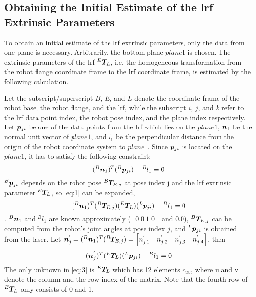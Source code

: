 \subsection{Obtaining the Initial Estimate of the \ac{lrf} Extrinsic Parameters}
\label{sec:first_step}
To obtain an initial estimate of the \ac{lrf} extrinsic parameters, only the data from one plane is necessary. Arbitrarily, the bottom plane $plane 1$ is chosen. The extrinsic parameters of the \ac{lrf} ${^E}\vb*{T}_L$, i.e. the homogeneous transformation from the robot flange coordinate frame to the \ac{lrf} coordinate frame, is estimated by the following calculation. 

Let the subscript/superscript $B$, $E$, and $L$ denote the coordinate frame of the robot base, the robot flange, and the \ac{lrf}, while the subscript $i$, $j$, and $k$ refer to the \ac{lrf} data point index, the robot pose index, and the plane index respectively. Let $\vb*{p}_{ji}$ be one of the data points from the \ac{lrf} which lies on the $plane 1$, $\vb*{n}_1$ be the normal unit vector of $plane 1$, and $l_1$ be the perpendicular distance from the origin of the robot coordinate system to $plane 1$.  Since $\vb*{p}_{ji}$ is located on the $plane 1$, it has to satisfy the following constraint:
  \begin{equation}
  \label{eq:1}
  ({^B}\vb*{n}_1) ^T ({^B}\vb*{p}_{ji}) - {^B}l_1 = 0
   \end{equation}
${^B}\vb*{p}_{ji}$ depends on the robot pose ${^B}\vb*{T}_{E,j}$ at pose index j and the \ac{lrf} extrinsic parameter ${^E}\vb*{T}_L$, so \eqref{eq:1}  can be expanded,
  \begin{equation}
  ({^B}\vb*{n}_1) ^T ({^B}\vb*{T}_{E,j}) ({^E}\vb*{T}_L) ({^L}\vb*{p}_{ji}) - {^B}l_1 = 0
  \end{equation}.
${^B}\vb*{n}_1$ and $^{B}l_1$ are known approximately ($[0 \; 0\; 1\;0]$ and $0.0$), ${^B}\vb*{T}_{E,j}$ can be computed from the robot's joint angles at pose index $j$, and ${^L}\vb*{p}_{ji}$ is obtained from the laser. Let $\vb*{n}^{'}_j = ({^B}\vb*{n}_1) ^T ({^B}\vb*{T}_{E,j}) = 
\left[n^{'}_{j,1} \quad n^{'}_{j,2} \quad n^{'}_{j,3}  \quad n^{'}_{j,4} \right]$, then  
  \begin{equation}
  \label{eq:3}
  (\vb*{n}^{'}_j) ^T ({^E}\vb*{T}_L) ({^L}\vb*{p}_{ji}) - {^B}l_1 = 0
  \end{equation}
The only unknown in \eqref{eq:3} is ${^E}\vb*{T}_L$ which has 12 elements $r_{uv}$, where u and v denote the column and the row index of the matrix. Note that the fourth row of ${^E}\vb*{T}_L$ only consists of 0 and 1. 
